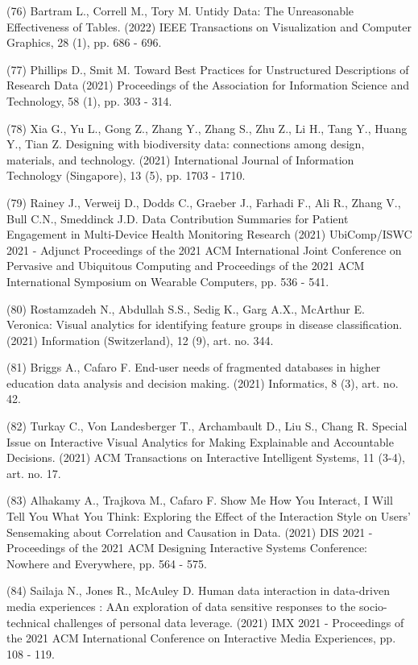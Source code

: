 \documentclass[
	12pt,				%
	oneside,			%
	a4paper,			%
	english,			%
	brazil				%
	]{abntex2ppgsi}
\begin{document}
\begin{apendicesenv}
(76) Bartram L., Correll M., Tory M. Untidy Data: The Unreasonable Effectiveness of Tables. (2022) IEEE Transactions on Visualization and Computer Graphics, 28 (1), pp. 686 - 696.

(77) Phillips D., Smit M. Toward Best Practices for Unstructured Descriptions of Research Data (2021) Proceedings of the Association for Information Science and Technology, 58 (1), pp. 303 - 314.

(78) Xia G., Yu L., Gong Z., Zhang Y., Zhang S., Zhu Z., Li H., Tang Y., Huang Y., Tian Z. Designing with biodiversity data: connections among design, materials, and technology. (2021) International Journal of Information Technology (Singapore), 13 (5), pp. 1703 - 1710.

(79) Rainey J., Verweij D., Dodds C., Graeber J., Farhadi F., Ali R., Zhang V., Bull C.N., Smeddinck J.D. Data Contribution Summaries for Patient Engagement in Multi-Device Health Monitoring Research (2021) UbiComp/ISWC 2021 - Adjunct Proceedings of the 2021 ACM International Joint Conference on Pervasive and Ubiquitous Computing and Proceedings of the 2021 ACM International Symposium on Wearable Computers, pp. 536 - 541.

(80) Rostamzadeh N., Abdullah S.S., Sedig K., Garg A.X., McArthur E. Veronica: Visual analytics for identifying feature groups in disease classification.(2021) Information (Switzerland), 12 (9), art. no. 344.

(81) Briggs A., Cafaro F. End-user needs of fragmented databases in higher education data analysis and decision making. (2021) Informatics, 8 (3), art. no. 42.


(82) Turkay C., Von Landesberger T., Archambault D., Liu S., Chang R. Special Issue on Interactive Visual Analytics for Making Explainable and Accountable Decisions. (2021) ACM Transactions on Interactive Intelligent Systems, 11 (3-4), art. no. 17.

(83) Alhakamy A., Trajkova M., Cafaro F. Show Me How You Interact, I Will Tell You What You Think: Exploring the Effect of the Interaction Style on Users' Sensemaking about Correlation and Causation in Data. (2021) DIS 2021 - Proceedings of the 2021 ACM Designing Interactive Systems Conference: Nowhere and Everywhere, pp. 564 - 575.

(84) Sailaja N., Jones R., McAuley D. Human data interaction in data-driven media experiences : AAn exploration of data sensitive responses to the socio-technical challenges of personal data leverage. (2021) IMX 2021 - Proceedings of the 2021 ACM International Conference on Interactive Media Experiences, pp. 108 - 119.


\end{apendicesenv}
\end{document}
